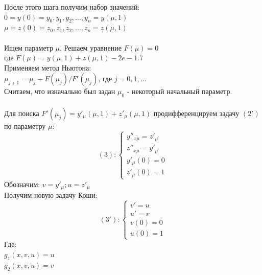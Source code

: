 \documentclass[12pt,a4paper]{article}
\begin{document}
        \noindent
        После этого шага получим набор значений:\\
        $0 = y(0) = y_{0}, y_{1}, y_{2}, \dotsc, y_{n} = y(\mu, 1)$\\
        $\mu = z(0) = z_{0}, z_{1}, z_{2}, \dotsc, z_{n} = z(\mu, 1)$\\\\
        
        \noindent
        Ищем параметр $\mu$. Решаем уравнение $F(\mu) = 0$\\
        где $F(\mu) = y(\mu, 1) + z(\mu, 1) - 2e - 1.7$\\
        Применяем метод Ньютона:\\
        $\mu_{j+1} = \mu_{j} - F(\mu_{j}) / F'(\mu_{j})$, где $j = 0, 1, \dots$\\
        Считаем, что изначально был задан $\mu_{0}$ - некоторый начальный параметр.\\\\
        
		\noindent
		Для поиска $F'(\mu_{j}) = y'_{\mu}(\mu, 1) + z'_{\mu}(\mu, 1)$
		продифференцируем задачу $(2')$ по параметру $\mu$:\\
		\[
		(3):
		\begin{cases}
			y''_{x\mu} = z'_{\mu}\\
			z''_{x\mu} = y'_{\mu}\\
			y'_{\mu}(0) = 0\\
			z'_{\mu}(0) = 1
		\end{cases}
		\]
		Обозначим: $v = y'_{\mu}; u = z'_{\mu}$\\
		Получим новую задачу Коши:\\
		\[
		(3'):
		\begin{cases}
			v' = u\\
			u' = v\\
			v(0) = 0\\
			u(0) = 1
		\end{cases}
		\]
		Где:\\
		$g_{1}(x, v, u) = u$\\
		$g_{2}(x, v, u) = v$\\\\
		
\end{document}

